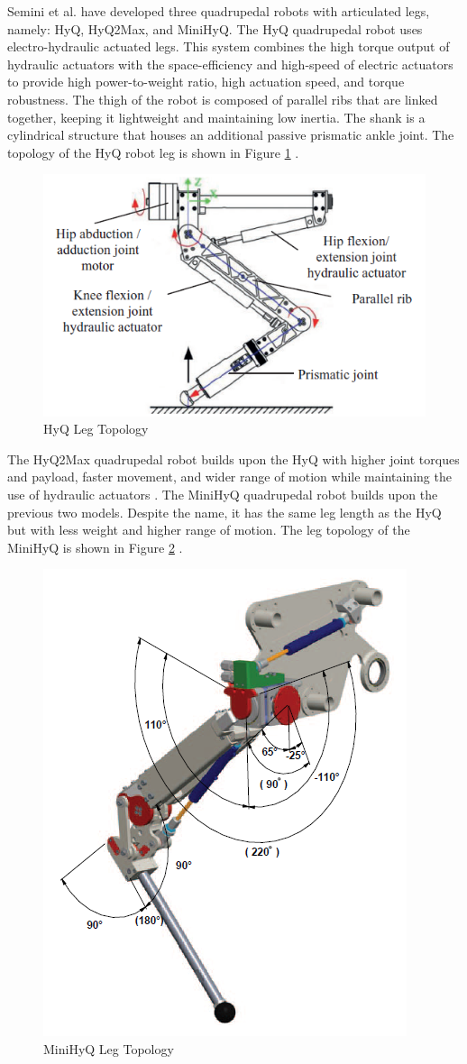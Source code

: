 \documentclass[english]{upeeei}
\begin{document}
Semini et al. have developed three quadrupedal robots with articulated legs, namely: HyQ, HyQ2Max, and MiniHyQ. The HyQ quadrupedal robot uses electro-hydraulic actuated legs. This system combines the high torque output of hydraulic actuators with the space-efficiency and high-speed of electric actuators to provide high power-to-weight ratio, high actuation speed, and torque robustness. The thigh of the robot is composed of parallel ribs that are linked together, keeping it lightweight and maintaining low inertia. The shank is a cylindrical structure that houses an additional passive prismatic ankle joint. The topology of the HyQ robot leg is shown in Figure \ref{fig:hyq-leg} \cite{quadrobotlegs, hyq}.

\begin{figure}[H]
\begin{centering}
\includegraphics[width=0.7\columnwidth]{images/hyq}
\par\end{centering}
\caption{HyQ Leg Topology\label{fig:hyq-leg}}
\end{figure}

The HyQ2Max quadrupedal robot builds upon the HyQ with higher joint torques and payload, faster movement, and wider range of motion while maintaining the use of hydraulic actuators \cite{hyq2max}. The MiniHyQ quadrupedal robot builds upon the previous two models. Despite the name, it has the same leg length as the HyQ but with less weight and higher range of motion. The leg topology of the MiniHyQ is shown in Figure \ref{fig:mini-hyq-leg} \cite{minihyq}.

\begin{figure}[H]
\begin{centering}
\includegraphics[width=0.3\columnwidth]{images/minihyq}
\par\end{centering}
\caption{MiniHyQ Leg Topology\label{fig:mini-hyq-leg}}
\end{figure}
\end{document}
